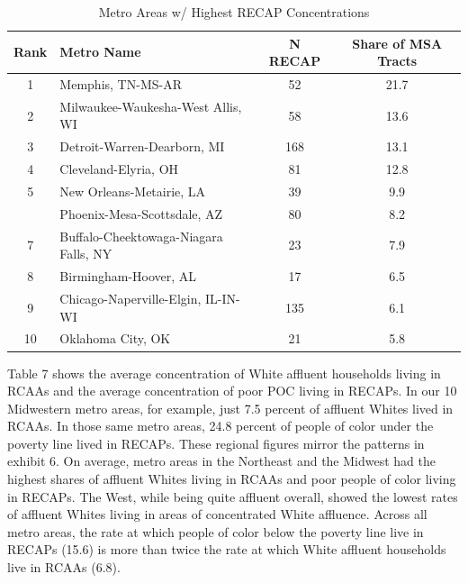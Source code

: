 \documentclass[11pt,]{article}
\begin{document}
\begin{table}[t]

\caption{\label{tab:table6}Metro Areas w/ Highest RECAP Concentrations}
\centering
\begin{tabular}{clcc}
\toprule
Rank & Metro Name & N RECAP & Share of MSA Tracts\\
\midrule
1 & Memphis, TN-MS-AR & 52 & 21.7\\
2 & Milwaukee-Waukesha-West Allis, WI & 58 & 13.6\\
3 & Detroit-Warren-Dearborn, MI & 168 & 13.1\\
4 & Cleveland-Elyria, OH & 81 & 12.8\\
5 & New Orleans-Metairie, LA & 39 & 9.9\\
\addlinespace
6 & Phoenix-Mesa-Scottsdale, AZ & 80 & 8.2\\
7 & Buffalo-Cheektowaga-Niagara Falls, NY & 23 & 7.9\\
8 & Birmingham-Hoover, AL & 17 & 6.5\\
9 & Chicago-Naperville-Elgin, IL-IN-WI & 135 & 6.1\\
10 & Oklahoma City, OK & 21 & 5.8\\
\bottomrule
\end{tabular}
\end{table}

Table 7 shows the average concentration of White affluent households
living in RCAAs and the average concentration of poor POC living in
RECAPs. In our 10 Midwestern metro areas, for example, just 7.5 percent
of affluent Whites lived in RCAAs. In those same metro areas, 24.8
percent of people of color under the poverty line lived in RECAPs. These
regional figures mirror the patterns in exhibit 6. On average, metro
areas in the Northeast and the Midwest had the highest shares of
affluent Whites living in RCAAs and poor people of color living in
RECAPs. The West, while being quite affluent overall, showed the lowest
rates of affluent Whites living in areas of concentrated White
affluence. Across all metro areas, the rate at which people of color
below the poverty line live in RECAPs (15.6) is more than twice the rate
at which White affluent households live in RCAAs (6.8).
\end{document}
